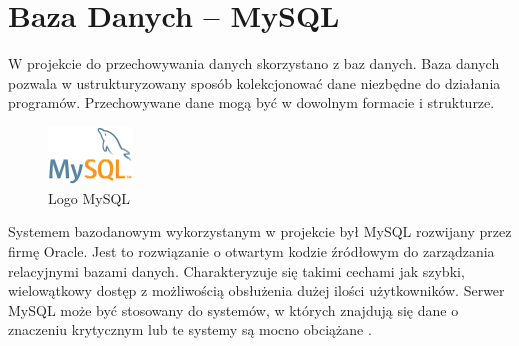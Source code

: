 \documentclass[eng,printmode,oneside]{mgr}
\begin{document}
\newpage
\section{Baza Danych -- MySQL}

W projekcie do przechowywania danych skorzystano z baz danych. Baza danych
pozwala w ustrukturyzowany sposób kolekcjonować dane niezbędne do działania
programów. Przechowywane dane mogą być w dowolnym formacie i strukturze.

\begin{figure}
\centering
\includegraphics[width=0.2\textwidth]{logomysql.png}
\caption{Logo MySQL \cite{Mysql.com}}
\label{fig:mysql}
\end{figure}

Systemem bazodanowym wykorzystanym w projekcie był MySQL rozwijany przez
firmę Oracle. Jest to rozwiązanie o otwartym kodzie źródłowym do zarządzania
relacyjnymi bazami danych.
Charakteryzuje się takimi cechami jak szybki, wielowątkowy dostęp z możliwością
obsłużenia dużej ilości użytkowników. Serwer MySQL może być stosowany do
systemów, w których znajdują się dane o znaczeniu krytycznym lub te systemy są
mocno obciążane \cite{Mysql.com}.
\end{document}
